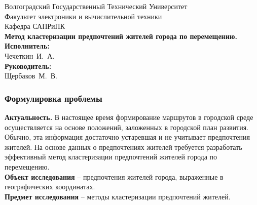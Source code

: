 \begin{frame} %
    \begin{center}
        \small
        Волгоградский Государственный Технический Университет \\
        Факультет электроники и вычислительной техники \\
        Кафедра САПРиПК \\
        \vspace{1.5cm}
        \normalsize
        \textbf{Метод кластеризации предпочтений жителей города по
        перемещению.}\\
        \vspace{1.0cm}
        \raggedleft\small
        \textbf{Исполнитель:}\\Чечеткин~И.~А.\\
        \textbf{Руководитель:}\\Щербаков~М.~В.\\
        \vspace{1.5cm}
        \vspace{\fill}
         \the\year
    \end{center}
\end{frame}

\begin{frame} %
    \frametitle{Формулировка проблемы}
    \textbf{Актуальность.} В настоящее время формирование маршрутов в городской
    среде осуществляется на основе положений, заложенных в городской план
    развития. Обычно, эта информация достаточно устаревшая и не учитывает
    предпочтения жителей. На основе данных о предпочтениях жителей требуется
    разработать эффективный метод кластеризации предпочтений жителей города
    по перемещению.\\
    \textbf{Объект исследования} -- предпочтения жителей города, выраженные
      в географических координатах.\\
    \textbf{Предмет исследования} -- методы кластеризации предпочтений жителей.
\end{frame}

